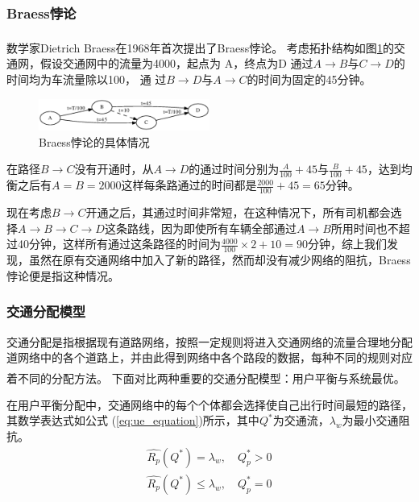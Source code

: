 \documentclass[fontset=windows,a4paper,12pt]{ctexart}
\newcommand{\upcite}[1]{\textsuperscript{\textsuperscript{\cite{#1}}}}
\renewcommand{\eqref}[1]{公式 (\ref{#1})}
\begin{document}
		\subsubsection{Braess悖论}
			数学家Dietrich Braess在1968年首次提出了Braess悖论\upcite{Braess1968Ü}。
			考虑拓扑结构如图\ref{fig:braess}的交通网，假设交通网中的流量为4000，起点为	A，终点为D
			通过$ A \rightarrow B $与$ C \rightarrow D $的时间均为车流量除以100，	通
			过$ B \rightarrow D $与$ A \rightarrow C $的时间为固定的45分钟。
			\begin{figure}[!htbp]
				\centering
				\includegraphics[width=0.5\textwidth]{pic/braess.eps}
				\caption{Braess悖论的具体情况}
				\label{fig:braess}
			\end{figure}
			在路径$ B \rightarrow C $没有开通时，从$ A \rightarrow D $的通过时间分别为$ \frac{A}{100}+45 $与$ \frac{B}
			{100} + 45 $，达到均衡之后有$ A=B=2000 $这样每条路通过的时间都是$ \frac{2000}{100}
			+45=65 $分钟。
		
			现在考虑$ B \rightarrow C $开通之后，其通过时间非常短，在这种情况下，所有司机都会选择$ A \rightarrow B \rightarrow C \rightarrow D $这条路线，因为即使所有车辆全部通过$ A \rightarrow B $所用时间也不超过40分钟，这样所有通过这条路径的时间为$ \frac{4000}{100}\times 2+10=90$分钟，综上我们发现，虽然在原有交通网络中加入了新的路径，然而却没有减少网络的阻抗，Braess悖论便是指这种情况。		
		\subsubsection{交通分配模型}
			交通分配是指根据现有道路网络，按照一定规则将进入交通网络的流量合理地分配道网络中的各个道路上，并由此得到网络中各个路段的数据，每种不同的规则对应着不同的分配方法\upcite{陆化普1996动态交通分配理论的回顾与展望}。
			下面对比两种重要的交通分配模型：用户平衡与系统最优\upcite{陆化普2006交通规划理论与方法}。
			
			在用户平衡分配中，交通网络中的每个个体都会选择使自己出行时间最短的路径，其数学表达式如\eqref{eq:ue_equation}所示，其中$Q^*$为交通流，$\lambda_w$为最小交通阻抗。
			\begin{equation}
				\begin{array}{c}
					\hat{R_p}(Q^*)=\lambda_w,\quad Q_p^* > 0\\
					\hat{R_p}(Q^*)\leq\lambda_w,\quad Q_p^* = 0
				\end{array}
				\label{eq:ue_equation}
			\end{equation}
			
\end{document}
